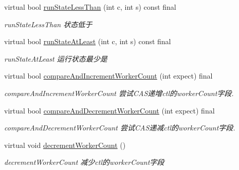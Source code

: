 \begin{DoxyCompactItemize}
virtual bool \hyperlink{classThreadPoolExecutor_aa12a3efb879080453fb7abc486585698}{run\+State\+Less\+Than} (int c, int s) const final
\begin{DoxyCompactList}\small\item\em run\+State\+Less\+Than 状态低于 \end{DoxyCompactList}\item 
virtual bool \hyperlink{classThreadPoolExecutor_a44ee48ed44faa12fc6373074e9059e4e}{run\+State\+At\+Least} (int c, int s) const final
\begin{DoxyCompactList}\small\item\em run\+State\+At\+Least 运行状态最少是 \end{DoxyCompactList}\item 
virtual bool \hyperlink{classThreadPoolExecutor_ac1bcafe65f800aeb9feade5f31b64fde}{compare\+And\+Increment\+Worker\+Count} (int expect) final
\begin{DoxyCompactList}\small\item\em compare\+And\+Increment\+Worker\+Count 尝试\+C\+A\+S递增ctl的worker\+Count字段. \end{DoxyCompactList}\item 
virtual bool \hyperlink{classThreadPoolExecutor_ac40053b88cd669526a0a6225b5e1a86e}{compare\+And\+Decrement\+Worker\+Count} (int expect) final
\begin{DoxyCompactList}\small\item\em compare\+And\+Decrement\+Worker\+Count 尝试\+C\+A\+S递减ctl的worker\+Count字段. \end{DoxyCompactList}\item 
\mbox{\label{classThreadPoolExecutor_ab19dcfa8af5864274e66bccf40255484}} 
virtual void \hyperlink{classThreadPoolExecutor_ab19dcfa8af5864274e66bccf40255484}{decrement\+Worker\+Count} ()
\begin{DoxyCompactList}\small\item\em decrement\+Worker\+Count 减少ctl的worker\+Count字段 \end{DoxyCompactList}\end{DoxyCompactItemize}
